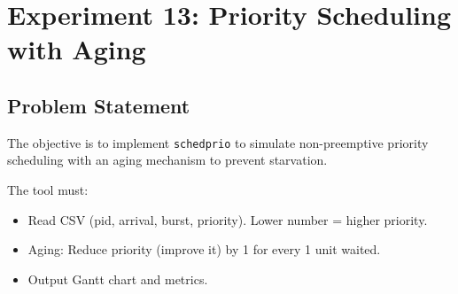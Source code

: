 
\section{Experiment 13: Priority Scheduling with Aging}

\subsection{Problem Statement}
The objective is to implement \texttt{schedprio} to simulate non-preemptive priority scheduling with an aging mechanism to prevent starvation.

The tool must:
\begin{itemize}
    \item Read CSV (pid, arrival, burst, priority). Lower number = higher priority.
    \item Aging: Reduce priority (improve it) by 1 for every 1 unit waited.
    \item Output Gantt chart and metrics.
\end{itemize}

